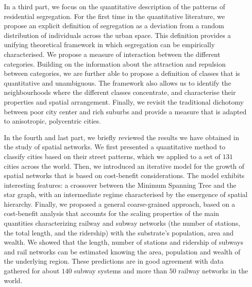 In a third part, we focus on the quantitative description of the patterns of
residential segregation. For the first time in the quantitative literature, we
propose an explicit definition of segregation as a deviation from a random
distribution of individuals across the urban space. This definition provides a
unifying theoretical framework in which segregation can be empirically
characterised. We propose a measure of interaction between the different
categories. Building on the information about the attraction and repulsion
between categories, we are further able to propose a definition of classes that
is quantitative and unambiguous. The framework also allows us to identify the
neighbourhoods where the different classes concentrate, and characterise their
properties and spatial arrangement. Finally, we revisit the traditional
dichotomy between poor city center and rich suburbs and provide a measure that
is adapted to anisotropic, polycentric cities. 

In the fourth and last part, we briefly reviewed the results we have obtained in
the study of spatial networks. We first presented a quantitative method to
classify cities based on their street patterns, which we applied to a set of
$131$ cities across the world. Then, we introduced an iterative model for the
growth of spatial networks that is based on cost-benefit considerations. The
model exhibits interesting features: a crossover between the Minimum Spanning
Tree and the star graph, with an intermediate regime characterised by the
emergence of spatial hierarchy. Finally, we proposed a general coarse-grained approach, based on a
cost-benefit analysis that accounts for the scaling properties of the main
quantities characterizing railway and subway networks (the number of stations, the total
length, and the ridership) with the substrate's population, area and wealth.
We showed that the length, number of stations and ridership of
subways and rail networks can be estimated knowing the area, population and
wealth of the underlying region. These predictions are in good agreement with
data gathered for about $140$ subway systems and more than $50$ railway networks in the
world.\\ 

